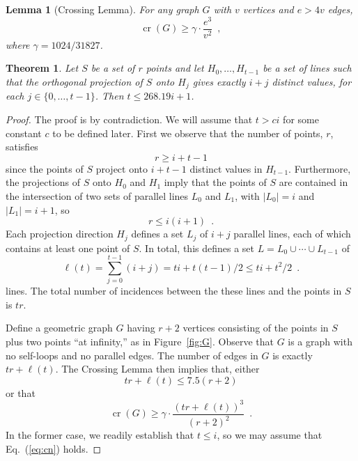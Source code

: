 \documentclass[12pt]{article}
\newtheorem{thm}{Theorem}
\newtheorem{lem}{Lemma}
\DeclareMathOperator{\cn}{cr}
\newcommand{\const}{268.19}
\begin{document}
\begin{lem}[Crossing Lemma]
For any graph $G$ with $v$ vertices and $e > 4v$ edges,
\[
  \cn(G) \ge \gamma \cdot \frac{e^3}{v^2} \enspace ,
\]
where $\gamma = 1024/31827$.
\end{lem}


\begin{thm}
Let $S$ be a set of $r$ points and let $H_0,\ldots,H_{t-1}$ be a
set of lines such that the orthogonal projection of $S$ onto $H_{j}$
gives exactly $i+j$ distinct values, for each $j\in\{0,\ldots,t-1\}$.
Then $t \le \const i+1$.
\end{thm}

\begin{proof}
The proof is by contradiction.  We will assume that $t > ci$ for some
constant $c$ to be defined later.
First we observe that the number of points, $r$, satisfies 
\[   r \ge i+t-1 
\]
since the points of $S$ project onto $i+t-1$ distinct values in $H_{t-1}$.
Furthermore, the projections of $S$ onto $H_0$ and $H_1$ imply that the
points of $S$ are contained in the intersection of two sets of parallel
lines $L_0$ and $L_1$, with $|L_0|=i$ and $|L_1|=i+1$, so
\[
   r \le i(i+1) \enspace .
\]
Each projection direction $H_j$ defines a set $L_j$ of $i+j$ parallel lines,
each of which contains at least one point of $S$.  In total, this defines
a set $L=L_0\cup\cdots\cup L_{t-1}$ of
\[
   \ell(t) = \sum_{j=0}^{t-1} (i+j) = ti + t(t-1)/2 \le ti + t^2/2 \enspace .
\]
lines.  The total number of incidences between the these lines and
the points in $S$ is $tr$.

Define a geometric graph $G$ having $r+2$ vertices consisting
of the points in $S$ plus two points ``at infinity,'' as in
Figure~\ref{fig:G}. Observe that $G$ is a graph with no self-loops and no
parallel edges. The number of
edges in $G$ is exactly $tr + \ell(t)$.
The Crossing Lemma \cite{XX} then implies that, either
\[
  tr +\ell(t) \le 7.5(r+2)
\]
or that
\begin{equation}
  \cn(G) \ge \gamma\cdot\frac{(tr+\ell(t))^3}{(r+2)^2} \enspace . \label{eq:cn}
\end{equation}
In the former case, we readily establish that $t \le i$,
so we may assume that Eq.~(\ref{eq:cn}) holds.


\end{proof}
\end{document}
